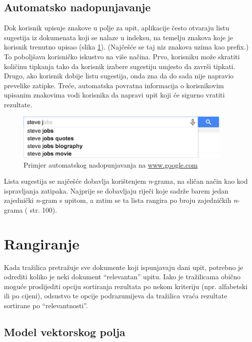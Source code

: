 \documentclass[a4paper,twoside,12pt]{scrreprt}
\begin{document}
\subsection{Automatsko nadopunjavanje}

Dok korisnik upisuje znakove u polje za upit, aplikacije često otvaraju listu sugestija iz dokumenata koji se nalaze u indeksu, na temelju znakova koje je korisnik trenutno upisao (slika \ref{typeahead}). (Najčešće se taj niz znakova uzima kao prefix.) To poboljšava korisničko iskustvo na više načina. Prvo, korisniku može skratiti količinu tipkanja tako da korisnik izabere sugestiju umjesto da završi tipkati. Drugo, ako korisnik dobije listu sugestija, onda zna da do sada nije napravio prevelike zatipke. Treće, automatska povratna informacija o korisnikovim upisanim znakovima vodi korisnika da napravi upit koji će sigurno vratiti rezultate.

\begin{figure}[H]
  \centering
  \includegraphics[width=300pt]{typeahead}
  \caption{Primjer automatskog nadopunjavanja na \url{www.google.com}}
  \label{typeahead}
\end{figure}

Lista sugestija se najčešće dobavlja korištenjem \textit{n}-grama, na sličan način kao kod ispravljanja zatipaka. Najprije se dobavljaju riječi koje sadrže barem jedan zajednički \textit{n}-gram s upitom, a zatim se ta lista rangira po broju zajedničkih \textit{n}-grama (\cite{taming} str. 100).

\section{Rangiranje}

Kada tražilica pretražuje sve dokumente koji ispunjavaju dani upit, potrebno je odrediti koliko je neki dokument ``relevantan'' upitu. Iako je tražilicama obično moguće proslijediti opciju sortiranja rezultata po nekom kriteriju (npr. alfabetski ili po cijeni), odsustvo te opcije podrazumijeva da tražilica vraća rezultate sortirane po ``relevantnosti''.

\subsection{Model vektorskog polja}
\end{document}
